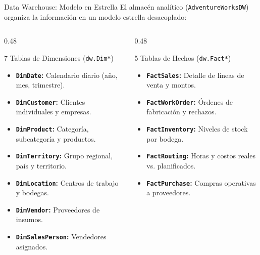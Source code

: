 \documentclass[aspectratio=169, 10pt]{beamer}
\begin{document}
\begin{frame}{Data Warehouse: Modelo en Estrella}
    El almacén analítico (\texttt{AdventureWorksDW}) organiza la información en un modelo estrella desacoplado:
    
    \vspace{0.15cm}
    \begin{columns}[t]
        \begin{column}{0.48\textwidth}
            \begin{block}{7 Tablas de Dimensiones (\texttt{dw.Dim*})}
                \footnotesize
                \begin{itemize}\setlength{\itemsep}{1pt}
                    \item \textbf{\texttt{DimDate}:} Calendario diario (año, mes, trimestre).
                    \item \textbf{\texttt{DimCustomer}:} Clientes individuales y empresas.
                    \item \textbf{\texttt{DimProduct}:} Categoría, subcategoría y productos.
                    \item \textbf{\texttt{DimTerritory}:} Grupo regional, país y territorio.
                    \item \textbf{\texttt{DimLocation}:} Centros de trabajo y bodegas.
                    \item \textbf{\texttt{DimVendor}:} Proveedores de insumos.
                    \item \textbf{\texttt{DimSalesPerson}:} Vendedores asignados.
                \end{itemize}
            \end{block}
        \end{column}
        
        \begin{column}{0.48\textwidth}
            \begin{block}{5 Tablas de Hechos (\texttt{dw.Fact*})}
                \footnotesize
                \begin{itemize}\setlength{\itemsep}{2.5pt}
                    \item \textbf{\texttt{FactSales}:} Detalle de líneas de venta y montos.
                    \item \textbf{\texttt{FactWorkOrder}:} Órdenes de fabricación y rechazos.
                    \item \textbf{\texttt{FactInventory}:} Niveles de stock por bodega.
                    \item \textbf{\texttt{FactRouting}:} Horas y costos reales vs. planificados.
                    \item \textbf{\texttt{FactPurchase}:} Compras operativas a proveedores.
                \end{itemize}
            \end{block}
        \end{column}
    \end{columns}
\end{frame}
\end{document}
